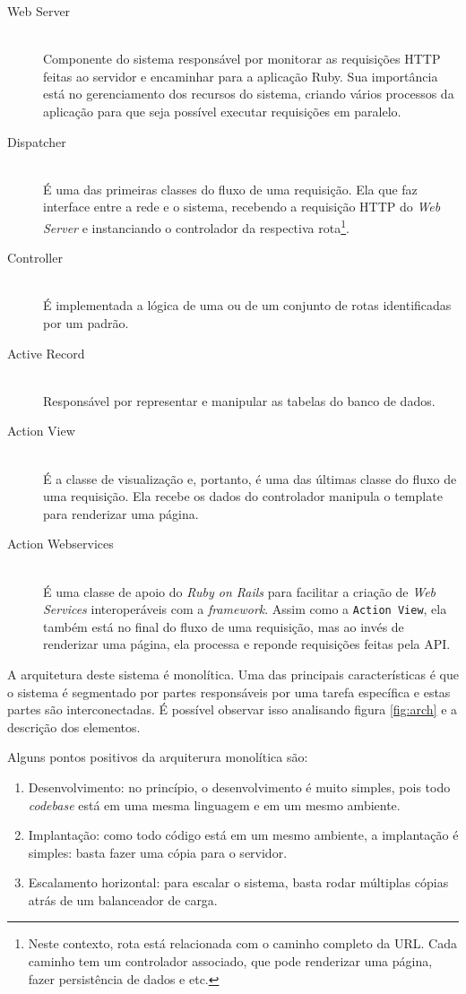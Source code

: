 \begin{description}
  \item[Web Server] \hfill \\ Componente do sistema responsável por monitorar as requisições HTTP feitas ao servidor e encaminhar para a aplicação Ruby. Sua importância está no gerenciamento dos recursos do sistema, criando vários processos da aplicação para que seja possível executar requisições em paralelo.
  \item[Dispatcher] \hfill \\ É uma das primeiras classes do fluxo de uma requisição. Ela que faz interface entre a rede e o sistema, recebendo a requisição HTTP do \emph{Web Server} e instanciando o controlador da respectiva rota\footnote{Neste contexto, rota está relacionada com o caminho completo da URL. Cada caminho tem um controlador associado, que pode renderizar uma página, fazer persistência de dados e etc.}.
  \item[Controller] \hfill \\ É implementada a lógica de uma ou de um conjunto de rotas identificadas por um padrão.
  \item[Active Record] \hfill \\ Responsável por representar e manipular as tabelas do banco de dados.
  \item[Action View] \hfill \\ É a classe de visualização e, portanto, é uma das últimas classe do fluxo de uma requisição. Ela recebe os dados do controlador manipula o template para renderizar uma página.
  \item[Action Webservices] \hfill \\ É uma classe de apoio do \emph{Ruby on Rails} para facilitar a criação de \emph{Web Services} interoperáveis com a \emph{framework}. Assim como a \texttt{Action View}, ela também está no final do fluxo de uma requisição, mas ao invés de renderizar uma página, ela processa e reponde requisições feitas pela API.
\end{description}

A arquitetura deste sistema é monolítica. Uma das principais características é que o sistema é segmentado por partes responsáveis por uma tarefa específica e estas partes são interconectadas. É possível observar isso analisando figura \ref{fig:arch} e a descrição dos elementos.

Alguns pontos positivos da arquiterura monolítica são:

\begin{enumerate}
  \item Desenvolvimento: no princípio, o desenvolvimento é muito simples, pois todo \emph{codebase} está em uma mesma linguagem e em um mesmo ambiente.
  \item Implantação: como todo código está em um mesmo ambiente, a implantação é simples: basta fazer uma cópia para o servidor.
  \item Escalamento horizontal: para escalar o sistema, basta rodar múltiplas cópias atrás de um balanceador de carga.
\end{enumerate}

